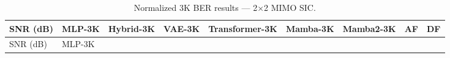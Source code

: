 \documentclass[
  english,
  12pt,
  12pt,
  a4paper,
  oneside]{report}
\begin{document}
\begin{longtable}[]{@{}
  >{\raggedright\arraybackslash}p{}
  >{\raggedright\arraybackslash}p{}
  >{\raggedright\arraybackslash}p{}
  >{\raggedright\arraybackslash}p{}
  >{\raggedright\arraybackslash}p{}
  >{\raggedright\arraybackslash}p{}
  >{\raggedright\arraybackslash}p{}
  >{\raggedright\arraybackslash}p{}
  >{\raggedright\arraybackslash}p{}@{}}
\caption{Normalized 3K BER results --- 2×2 MIMO SIC.}\label{tbl:table12}\tabularnewline
\toprule\noalign{}
\begin{minipage}[b]{\linewidth}\raggedright
SNR (dB)
\end{minipage} & \begin{minipage}[b]{\linewidth}\raggedright
MLP-3K
\end{minipage} & \begin{minipage}[b]{\linewidth}\raggedright
Hybrid-3K
\end{minipage} & \begin{minipage}[b]{\linewidth}\raggedright
VAE-3K
\end{minipage} & \begin{minipage}[b]{\linewidth}\raggedright
Transformer-3K
\end{minipage} & \begin{minipage}[b]{\linewidth}\raggedright
Mamba-3K
\end{minipage} & \begin{minipage}[b]{\linewidth}\raggedright
Mamba2-3K
\end{minipage} & \begin{minipage}[b]{\linewidth}\raggedright
AF
\end{minipage} & \begin{minipage}[b]{\linewidth}\raggedright
DF
\end{minipage} \\
\midrule\noalign{}
\endfirsthead
\toprule\noalign{}
\begin{minipage}[b]{\linewidth}\raggedright
SNR (dB)
\end{minipage} & \begin{minipage}[b]{\linewidth}\raggedright
MLP-3K
\end{minipage} & \begin{minipage}[b]{\linewidth}\raggedright

\end{minipage}
\end{longtable}
\end{document}
